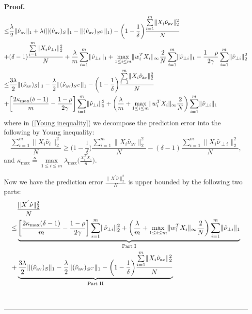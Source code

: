 \documentclass{article}
\theoremstyle{break}
\newenvironment{proof}[1][Proof]{\noindent\textbf{#1.} }{\ \rule{0.5em}{0.5em}}
\begin{document}
\begin{proof}
\begin{align}
    \leq &\frac{\lambda}{2}\lVert\hat{\nu}_{\text{av}}\rVert_1+\lambda(\lVert(\hat{\nu}_{\text{av}})_{S}\rVert_1-\lVert(\hat{\nu}_{\text{av}})_{S^C}\rVert_1)-\bigg(1-\frac{1}{\delta}\bigg)\frac{\sum\limits_{i=1}^m\lVert X_i\hat{\nu}_{\text{av}}\rVert_2^2}{N}\label{Young inequality}\\
    +&(\delta-1)\frac{\sum\limits_{i=1}^m\lVert X_i\hat{\nu}_{\perp i}\rVert_2^2}{N}+\frac{\lambda}{m}\sum\limits_{i=1}^m\lVert\hat{\nu}_{\perp i}\rVert_1+\max\limits_{1\leq i\leq m}\lVert w_i^T X_i\rVert_{\infty}\frac{2}{N}\sum\limits_{i=1}^m\lVert\hat{\nu}_{\perp i}\rVert_1-\frac{1-\rho}{2\gamma}\sum\limits_{i=1}^m\lVert\hat{\nu}_{\perp i}\rVert_2^2\notag\\
    \leq &\frac{3\lambda}{2}\lVert(\hat{\nu}_{\text{av}})_{S}\rVert_1-\frac{\lambda}{2}\lVert(\hat{\nu}_{\text{av}})_{S^C}\rVert_1-\bigg(1-\frac{1}{\delta}\bigg)\frac{\sum\limits_{i=1}^m\lVert X_i\hat{\nu}_{\text{av}}\rVert_2^2}{N}\notag\\
    +&\bigg[\frac{2\kappa_{\max}(\delta-1)}{m}-\frac{1-\rho}{2\gamma}\bigg]\sum\limits_{i=1}^m\lVert\hat{\nu}_{\perp i}\rVert_2^2
    +\bigg(\frac{\lambda}{m}+\max\limits_{1\leq i\leq m}\lVert w_i^T X_i\rVert_{\infty}\frac{2}{N}\bigg)\sum\limits_{i=1}^m\lVert\hat{\nu}_{\perp i}\rVert_1\\
\end{align}
where in (\ref{Young inequality}) we decompose the prediction error into the following by Young inequality:
\begin{equation}
    \frac{\sum\limits_{i=1}^m\lVert X_i
    \hat{\nu}_i\rVert_2^2}{N} \geq\bigg(1-\frac{1}{\delta}\bigg)\frac{\sum\limits_{i=1}^m\lVert X_i\hat{\nu}_{\text{av}}\rVert_2^2}{N}-(\delta-1)\frac{\sum\limits_{i=1}^m\lVert X_i\hat{\nu}_{\perp i}\rVert_2^2}{N},
\end{equation}
and $\kappa_{\max}\triangleq\max\limits_{1\leq i\leq m}\lambda_{\max}\bigg(\frac{X_i^T X_i}{n}\bigg).$

Now we have the prediction error $\frac{\lVert X^{'}\hat{\nu}\rVert_2^2}{N}$ is upper bounded by the following two parts:
\begin{align}\label{intermedia step}
    &\frac{\lVert X^{'}\hat{\nu}\rVert_2^2}{N}\notag\\
    \leq &\underbrace{\bigg[\frac{2\kappa_{\max}(\delta-1)}{m}-\frac{1-\rho}{2\gamma}\bigg]\sum\limits_{i=1}^m\lVert\hat{\nu}_{\perp i}\rVert_2^2
    +\bigg(\frac{\lambda}{m}+\max\limits_{1\leq i\leq m}\lVert w_i^T X_i\rVert_{\infty}\frac{2}{N}\bigg)\sum\limits_{i=1}^m\lVert\hat{\nu}_{\perp i}\rVert_1}_{\text{Part I}}\notag\\
    +&\underbrace{\frac{3\lambda}{2}\lVert(\hat{\nu}_{\text{av}})_{S}\rVert_1-\frac{\lambda}{2}\lVert(\hat{\nu}_{\text{av}})_{S^C}\rVert_1-\bigg(1-\frac{1}{\delta}\bigg)\frac{\sum\limits_{i=1}^m\lVert X_i\hat{\nu}_{\text{av}}\rVert_2^2}{N}}_{\text{Part II}}\notag\\
\end{align}


\end{proof}
\end{document}
